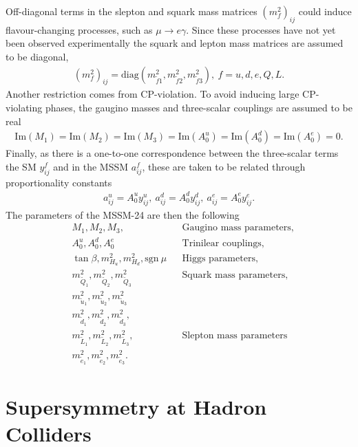 \documentclass[twoside,english]{uiofysmaster}
\begin{document}
Off-diagonal terms in the slepton and squark mass matrices $(m_f^2)_{ij}$ could induce flavour-changing processes, such as $\mu \rightarrow e \gamma$. Since these processes have not yet been observed experimentally the squark and lepton mass matrices are assumed to be diagonal,
\begin{align}
(m_f^2)_{ij} = \text{diag}(m_{\tilde{f}1}^2, m_{\tilde{f}2}^2, m_{\tilde{f}3}^2), ~f = u, d, e, Q, L.
\end{align}
Another restriction comes from CP-violation. To avoid inducing large CP-violating phases, the gaugino masses and three-scalar couplings are assumed to be real
\begin{align}
\text{Im}(M_1) = \text{Im}(M_2) = \text{Im} (M_3) = \text{Im} (A_0^u) = \text{Im} (A_0^d) = \text{Im} (A_0^e) = 0.
\end{align}
Finally, as there is a one-to-one correspondence between the three-scalar terms the SM $y_{ij}^f$ and in the MSSM $a^f_{ij}$, these are taken to be related through proportionality constants
\begin{align}
a^u_{ij} = A_0^uy_{ij}^u, ~a^d_{ij} = A_0^dy_{ij}^d, ~a^e_{ij} = A_0^ey_{ij}^e.
\end{align}
 The parameters of the MSSM-24 are then the following
\begin{align}
&M_1, M_2, M_3, && \text{Gaugino mass parameters,} \nonumber \\
&A_0^u, A_0^d, A_0^e && \text{Trinilear couplings,} \nonumber\\
&\tan \beta,m_{H_u}^2,m_{H_d}^2, \text{sgn}~ \mu && \text{Higgs parameters,} \nonumber\\
& m_{\tilde{Q}_1}^2, m_{\tilde{Q}_2}^2, m_{\tilde{Q}_3}^2 && \text{Squark mass parameters,}\nonumber\\
& m_{\tilde{u}_1}^2, m_{\tilde{u}_2}^2, m_{\tilde{u}_3}^2\nonumber\\
&m_{\tilde{d}_1}^2, m_{\tilde{d}_2}^2, m_{\tilde{d}_3}^2,\nonumber\\
& m_{\tilde{L}_1}^2, m_{\tilde{L}_2}^2, m_{\tilde{L}_3}^2, &&\text{Slepton mass parameters}\nonumber\\
& m_{\tilde{e}_1}^2, m_{\tilde{e}_2}^2, m_{\tilde{e}_3}^2.\nonumber
\end{align}





\chapter{Supersymmetry at Hadron Colliders}
\end{document}
